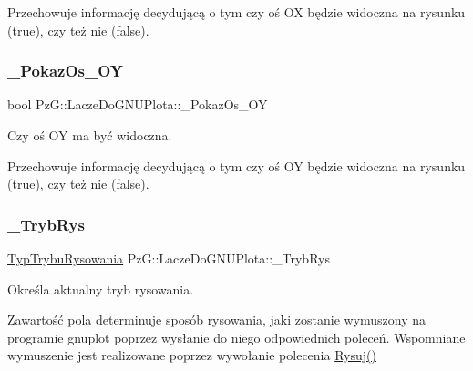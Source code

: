 Przechowuje informację decydującą o tym czy oś OX będzie widoczna na rysunku ({\ttfamily true}), czy też nie ({\ttfamily false}). \mbox{\label{class_pz_g_1_1_lacze_do_g_n_u_plota_ae8d9b4dac5eae6ce86b7043c45b70ed8}} 
\subsubsection{\texorpdfstring{\_PokazOs\_OY}{\_PokazOs\_OY}}
{\footnotesize\ttfamily bool Pz\+G\+::\+Lacze\+Do\+G\+N\+U\+Plota\+::\+\_\+\+Pokaz\+Os\+\_\+\+OY\hspace{0.3cm}{\ttfamily [protected]}}



Czy oś OY ma być widoczna. 

Przechowuje informację decydującą o tym czy oś OY będzie widoczna na rysunku ({\ttfamily true}), czy też nie ({\ttfamily false}). \mbox{\label{class_pz_g_1_1_lacze_do_g_n_u_plota_a7d9bde70af80b5224c5771f4768a9bab}} 
\subsubsection{\texorpdfstring{\_TrybRys}{\_TrybRys}}
{\footnotesize\ttfamily \mbox{\hyperlink{namespace_pz_g_aef59d70a0ee2eab473790613c3628944}{Typ\+Trybu\+Rysowania}} Pz\+G\+::\+Lacze\+Do\+G\+N\+U\+Plota\+::\+\_\+\+Tryb\+Rys\hspace{0.3cm}{\ttfamily [protected]}}



Określa aktualny tryb rysowania. 

Zawartość pola determinuje sposób rysowania, jaki zostanie wymuszony na programie {\ttfamily gnuplot} poprzez wysłanie do niego odpowiednich poleceń. Wspomniane wymuszenie jest realizowane poprzez wywołanie polecenia \mbox{\hyperlink{class_pz_g_1_1_lacze_do_g_n_u_plota_a065f5b8402737cc62b0ad4f66d028335}{Rysuj()}} \mbox{\label{class_pz_g_1_1_lacze_do_g_n_u_plota_adc3a2250216c2473a61da379da70b2d7}} 
